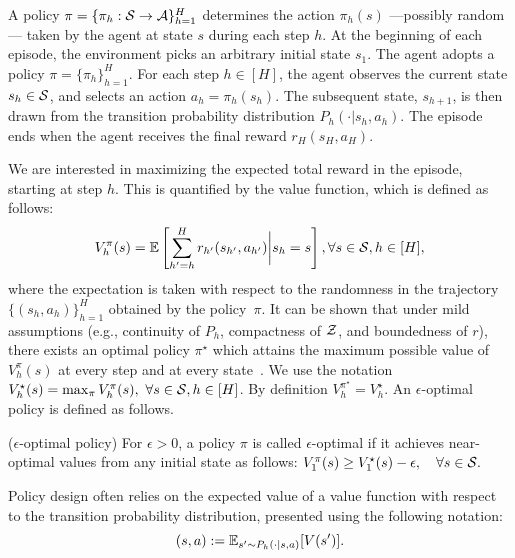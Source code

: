 A policy $\pi = \{\pi_h: \mathcal{S} \rightarrow \mathcal{A}\}_{h=1}^H$ determines the action $\pi_h(s)$ ---possibly random--- taken by the agent at state $s$ during each step $h$.  
At the beginning of each episode, the environment picks an arbitrary initial state $s_1$. The agent adopts a policy $\pi=\{\pi_h\}_{h=1}^H$. For each step $h\in[H]$, the agent observes the current state $s_h\in\mathcal{S}$, and selects an action $a_h=\pi_h(s_h)$. The subsequent state, $s_{h+1}$, is then drawn from the transition probability distribution $P_h(\cdot|s_h, a_h)$. The episode ends when the agent receives the final reward $r_H(s_H,a_H)$.  



We are interested in maximizing the expected total reward in the episode, starting at step $h$. This is quantified by the value function, which is defined as follows:
\begin{equation}
V^{\pi}_h(s) = \mathbb{E}\left[\sum_{h'=h}^Hr_{h'}(s_{h'},a_{h'})\bigg|s_{h}=s\right], \forall s\in\mathcal{S}, h\in[H],
\end{equation}
where the expectation is taken with respect to the randomness in the trajectory $\{(s_h,a_h)\}_{h=1}^H$ obtained by the policy~$\pi$. It can be shown that under mild assumptions (e.g., continuity of $P_h$, compactness of $\mathcal{Z}$, and boundedness of $r$), there exists an optimal policy $\pi^{\star}$ which attains the maximum possible value of $V^{\pi}_{h}(s)$ at every step and at every state~\citep[e.g., see,][]{puterman2014markov}. We use the notation
$
V_{h}^{\star}(s) = \max_{\pi}V_h^{\pi}(s), ~\forall s\in\mathcal{S}, h\in[H]
$.
By definition $V^{\pi^{\star}}_h=V_{h}^{\star}$.
An $\epsilon$-optimal policy is defined as follows. 

\begin{definition}\label{def:epsopt}
($\epsilon$-optimal policy) For $\epsilon>0$, a policy $\pi$ is called $\epsilon$-optimal if it achieves near-optimal values from any initial state as follows:
$
V_1^{\pi}(s) \geq V_1^{\star}(s) - \epsilon, ~~~ \forall s \in \mathcal{S}.
$
\end{definition}

Policy design often relies on the expected value of a value function with respect to the transition probability distribution, presented using the following notation:
\begin{equation}
    [P_hV](s,a) := \E_{s'\sim P_h(\cdot|s,a)}[V(s')].  
\end{equation}

